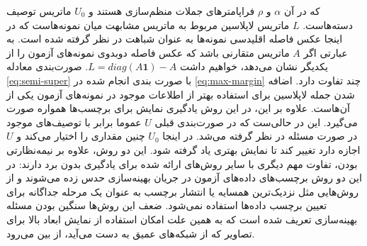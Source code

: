که در آن $\alpha$ و $\rho$ فراپامترهای جملات منظم‌سازی هستند و $U_0$ ماتریس توصیف دسته‌هاست.  $L$ ماتریس لاپلاسین مربوط به ماتریس مشابهت میان نمونه‌هاست که در اینجا عکس فاصله اقلیدسی نمونه‌ها به عنوان شباهت در نظر گرفته شده است. به عبارتی اگر $A$ ماتریس متقارنی باشد که عکس فاصله دوبدوی نمونه‌های آزمون را از یکدیگر نشان می‌دهد، خواهیم داشت 
$ L = diag(A\mathbf{1}) - A$.
صورت‌بندی معادله \eqref{eq:semi-super} با صورت بندی انجام شده در \eqref{eq:max-margin} چند تفاوت دارد. اضافه شدن جمله لاپلاسین برای استفاده بهتر از اطلاعات موجود در نمونه‌های آزمون یکی از آن‌هاست. علاوه بر این، در این روش یادگیری نمایش برای برچسب‌ها همواره صورت می‌گیرد. این در حالی‌ست که در صورت‌بندی قبلی $U$ عموما برابر با توصیف‌های موجود در صورت مسئله در نظر گرفته می‌شد. در اینجا $U_0$ چنین مقداری را اختیار می‌کند و $U$ اجازه دارد تغییر کند تا نمایش بهتری یاد گرفته شود. این دو روش، علاوه بر نیمه‌نظارتی بودن، تفاوت مهم دیگری با سایر روش‌های ارائه شده برای یادگیری بدون برد دارند: در این دو روش برچسب‌های داده‌های آزمون در جریان بهینه‌سازی حدس زده می‌شوند و از روش‌هایی مثل نزدیک‌ترین همسایه یا انتشار برچسب به عنوان یک مرحله جداگانه برای تعیین برچسب داده‌ها استفاده نمی‌شود. ضعف این روش‌ها سنگین بودن مسئله بهینه‌سازی تعریف شده است که به همین علت امکان استفاده از نمایش ابعاد بالا برای تصاویر که از شبکه‌های عمیق به دست می‌آید، از بین می‌رود.

